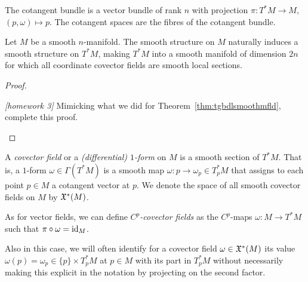 The cotangent bundle is a vector bundle of rank $n$ with projection $\pi:T^*M\to M$, $(p,\omega)\mapsto p$.
The cotangent spaces are the fibres of the cotangent bundle. 

\begin{theorem}
  Let $M$ be a smooth $n$-manifold.
  The smooth structure on $M$ naturally induces a smooth structure on $T^*M$, making $T^*M$ into a smooth manifold of dimension $2n$ for which all coordinate covector fields are smooth local sections.
\end{theorem}
\begin{proof}
  \begin{exercise}\textit{[homework 3]}
    Mimicking what we did for Theorem~\ref{thm:tgbdlsmoothmfld}, complete this proof.
  \end{exercise}
\end{proof}

\begin{definition}
  A \emph{covector field} or a \emph{(differential) $1$-form} on $M$ is a smooth section of $T^*M$.
  That is, a $1$-form $\omega\in\Gamma(T^*M)$ is a smooth map $\omega: p \to \omega_p \in T_p^*M$ that assigns to each point $p\in M$ a cotangent vector at $p$.
  We denote the space of all smooth covector fields on $M$ by $\mathfrak{X}^*(M)$.

  As for vector fields, we can define \emph{$C^p$-covector fields} as the $C^p$-maps $\omega:M\to T^*M$ such that $\pi\circ\omega = \operatorname{id}_M$.
\end{definition}

Also in this case, we will often identify for a covector field $\omega\in\mathfrak{X}^*(M)$ its value $\omega(p) = \omega_p \in \{p\}\times T^*_p M$ at $p\in M$ with its part in $T_p^*M$ without necessarily making this explicit in the notation by projecting on the second factor.


